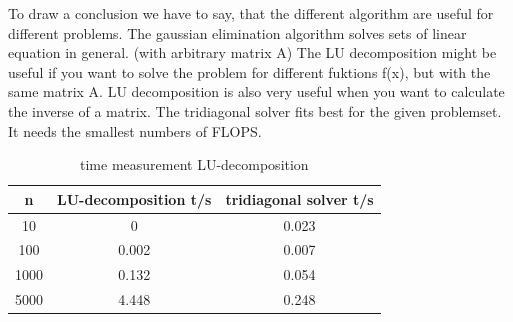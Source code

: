 \documentclass[10pt,a4paper]{article}
\begin{document}
To draw a conclusion we have to say, that the different algorithm are useful for different problems. The gaussian elimination algorithm solves sets of linear equation in general. (with arbitrary matrix A) 
The LU decomposition might be useful if you want to solve the problem for different fuktions f(x), but with the same matrix A. LU decomposition is also very useful when you want to calculate the inverse of a matrix. The tridiagonal solver fits best for the given problemset. It needs the smallest numbers of FLOPS. 

\begin{table}
\centering
\caption{time measurement LU-decomposition}
\label{LU tridiagonal time}
\begin{tabular}{c|c|c}
n & LU-decomposition t/s & tridiagonal solver t/s \\
\hline\hline
10  &0 & 0.023\\
100  &0.002 & 0.007\\
1000 & 0.132 & 0.054\\
5000 & 4.448 & 0.248\\
\end{tabular}
\end{table}
\end{document}
